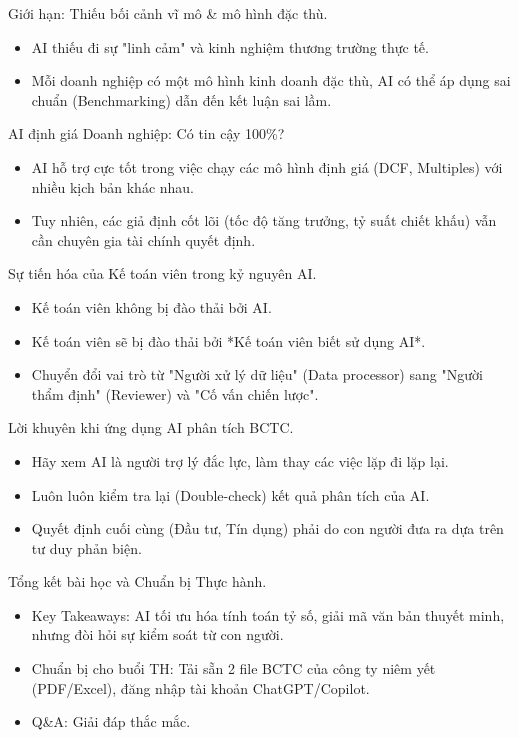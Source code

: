 \documentclass[aspectratio=169]{beamer}
\begin{document}
\begin{frame}{Giới hạn: Thiếu bối cảnh vĩ mô \& mô hình đặc thù.}
    \begin{itemize}
        \item AI thiếu đi sự "linh cảm" và kinh nghiệm thương trường thực tế.
        \item Mỗi doanh nghiệp có một mô hình kinh doanh đặc thù, AI có thể áp dụng sai chuẩn (Benchmarking) dẫn đến kết luận sai lầm.
    \end{itemize}
\end{frame}


\begin{frame}{AI định giá Doanh nghiệp: Có tin cậy 100\%?}
    \begin{itemize}
        \item AI hỗ trợ cực tốt trong việc chạy các mô hình định giá (DCF, Multiples) với nhiều kịch bản khác nhau.
        \item Tuy nhiên, các giả định cốt lõi (tốc độ tăng trưởng, tỷ suất chiết khấu) vẫn cần chuyên gia tài chính quyết định.
    \end{itemize}
\end{frame}


\begin{frame}{Sự tiến hóa của Kế toán viên trong kỷ nguyên AI.}
    \begin{itemize}
        \item Kế toán viên không bị đào thải bởi AI.
        \item Kế toán viên sẽ bị đào thải bởi *Kế toán viên biết sử dụng AI*.
        \item Chuyển đổi vai trò từ "Người xử lý dữ liệu" (Data processor) sang "Người thẩm định" (Reviewer) và "Cố vấn chiến lược".
    \end{itemize}
\end{frame}


\begin{frame}{Lời khuyên khi ứng dụng AI phân tích BCTC.}
    \begin{itemize}
        \item Hãy xem AI là người trợ lý đắc lực, làm thay các việc lặp đi lặp lại.
        \item Luôn luôn kiểm tra lại (Double-check) kết quả phân tích của AI.
        \item Quyết định cuối cùng (Đầu tư, Tín dụng) phải do con người đưa ra dựa trên tư duy phản biện.
    \end{itemize}
\end{frame}


\begin{frame}{Tổng kết bài học và Chuẩn bị Thực hành.}
    \begin{itemize}
        \item Key Takeaways: AI tối ưu hóa tính toán tỷ số, giải mã văn bản thuyết minh, nhưng đòi hỏi sự kiểm soát từ con người.
        \item Chuẩn bị cho buổi TH: Tải sẵn 2 file BCTC của công ty niêm yết (PDF/Excel), đăng nhập tài khoản ChatGPT/Copilot.
        \item Q\&A: Giải đáp thắc mắc.
    \end{itemize}
\end{frame}
\end{document}
